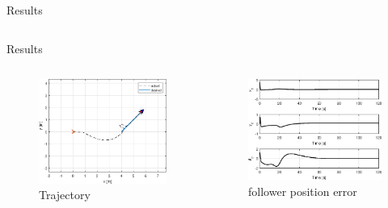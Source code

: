 \documentclass{beamer}
\begin{document}
\begin{frame}{Results}
\begin{columns}
\begin{column}{0.5\textwidth}
\end{column}

\end{columns}
\end{frame}  
\begin{frame}{Results}
\begin{columns}
\begin{column}{0.5\textwidth}
\begin{figure}
\includegraphics[scale=0.4]{figs/matlab/gradientDescent/inclinedLine/trajectory.eps}
\caption{Trajectory}
\end{figure}
\end{column}

\begin{column}{0.5\textwidth}
\begin{center}

\begin{figure}
\includegraphics[scale=0.4]{figs/matlab/gradientDescent/inclinedLine/error.eps}
\caption{follower position error}
\end{figure}
\end{center}


\end{column}
\end{columns}
\end{frame}
\end{document}
